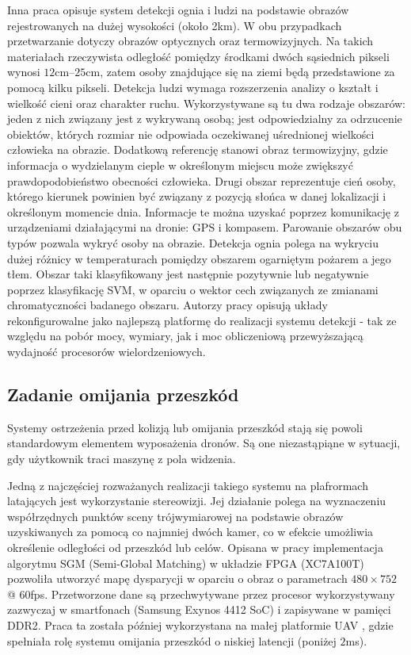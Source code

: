 Inna praca \cite{FIRE} opisuje system detekcji ognia i ludzi na podstawie obrazów rejestrowanych na dużej wysokości (około 2km). W obu przypadkach przetwarzanie dotyczy obrazów optycznych oraz termowizyjnych. Na takich materiałach rzeczywista odległość pomiędzy środkami dwóch sąsiednich pikseli wynosi $12$cm--$25$cm, zatem osoby znajdujące się na ziemi będą przedstawione za pomocą kilku pikseli. \newline 
Detekcja ludzi wymaga rozszerzenia analizy o kształt i wielkość cieni oraz charakter ruchu. Wykorzystywane są tu dwa rodzaje obszarów: jeden z nich związany jest z wykrywaną osobą; jest odpowiedzialny za odrzucenie obiektów, których rozmiar nie odpowiada oczekiwanej uśrednionej wielkości człowieka na obrazie. Dodatkową referencję stanowi obraz termowizyjny, gdzie informacja o wydzielanym cieple w określonym miejscu może zwiększyć prawdopodobieństwo obecności człowieka. Drugi obszar reprezentuje cień osoby, którego kierunek powinien być związany z pozycją słońca w danej lokalizacji i określonym momencie dnia. Informacje te można uzyskać poprzez komunikację z urządzeniami działającymi na dronie: GPS i kompasem. Parowanie obszarów obu typów pozwala wykryć osoby na obrazie.\newline
Detekcja ognia polega na wykryciu dużej różnicy w temperaturach pomiędzy obszarem ogarniętym pożarem a jego tłem. Obszar taki klasyfikowany jest następnie pozytywnie lub negatywnie poprzez klasyfikację SVM, w oparciu o wektor cech związanych ze zmianami chromatyczności badanego obszaru.
Autorzy pracy opisują układy rekonfigurowalne jako najlepszą platformę do realizacji systemu detekcji  - tak ze względu na pobór mocy, wymiary, jak i moc obliczeniową przewyższającą wydajność procesorów wielordzeniowych.


\subsection{Zadanie omijania przeszkód}
Systemy ostrzeżenia przed kolizją lub omijania przeszkód stają się powoli standardowym elementem wyposażenia dronów. Są one niezastąpiąne w sytuacji, gdy użytkownik traci maszynę z pola widzenia. 

Jedną z najczęściej rozważanych realizacji takiego systemu na plafrormach latających jest wykorzystanie stereowizji. Jej działanie polega na wyznaczeniu współrzędnych punktów sceny trójwymiarowej na podstawie obrazów uzyskiwanych za pomocą co najmniej dwóch kamer, co w efekcie umożliwia określenie odległości od przeszkód lub celów. Opisana w pracy \cite{STEREOVISION} implementacja algorytmu SGM (Semi-Global Matching) w układzie FPGA (XC7A100T) pozwoliła utworzyć mapę dysparycji w oparciu o obraz o parametrach $480\times 752$ @ $60$fps. Przetworzone dane są przechwytywane przez procesor wykorzystywany zazwyczaj w smartfonach (Samsung Exynos 4412 SoC) i zapisywane w pamięci DDR2. Praca ta została później wykorzystana na małej platformie UAV \cite{STEREOVISION2}, gdzie spełniała rolę systemu omijania przeszkód o niskiej latencji (poniżej $2$ms).

